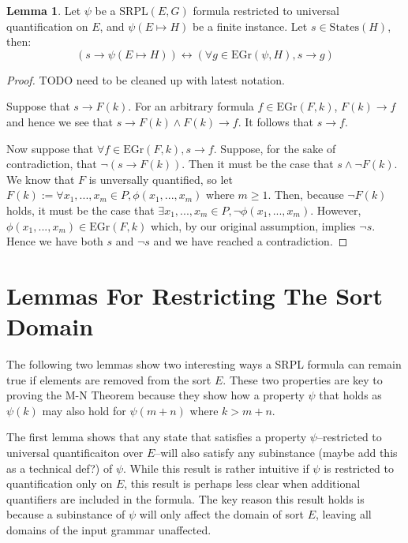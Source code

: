 \documentclass[12pt]{article}
\theoremstyle{definition}
\newtheorem{lemma}{Lemma}
\theoremstyle{remark}
\newcommand{\states}{\text{States}}
\newcommand{\gr}{\text{EGr}}
\newcommand{\SRPL}{\text{SRPL}}
\begin{document}
\begin{lemma}
  \label{lem:pnf-ground}
  Let $\psi$ be a $\SRPL(E,G)$ formula restricted to universal quantification on $E$, and $\psi(E \mapsto H)$ be a finite instance.  Let $s \in \states(H)$, then:
  $$(s \rightarrow \psi(E \mapsto H)) \leftrightarrow (\forall g \in \gr(\psi,H), s \rightarrow g)$$
\end{lemma}
\begin{proof}
  TODO need to be cleaned up with latest notation.

  Suppose that $s \rightarrow F(k)$.  For an arbitrary formula $f \in \gr(F,k)$, $F(k) \rightarrow f$ and hence we see that $s \rightarrow F(k) \land F(k) \rightarrow f$.  It follows that $s \rightarrow f$.

  Now suppose that $\forall f \in \gr(F,k), s \rightarrow f$.  Suppose, for the sake of contradiction, that $\neg(s \rightarrow F(k))$.  Then it must be the case that $s \land \neg F(k)$.  We know that $F$ is unversally quantified, so let $F(k) := \forall x_1,...,x_m \in P, \phi(x_1,...,x_m)$ where $m \geq 1$.  Then, because $\neg F(k)$ holds, it must be the case that $\exists x_1,...,x_m \in P, \neg \phi(x_1,...,x_m)$.  However, $\phi(x_1,...,x_m) \in \gr(F,k)$ which, by our original assumption, implies $\neg s$.  Hence we have both $s$ and $\neg s$ and we have reached a contradiction.
\end{proof}



\section{Lemmas For Restricting The Sort Domain}

The following two lemmas show two interesting ways a SRPL formula can remain true if elements are removed from the sort $E$.  These two properties are key to proving the M-N Theorem because they show how a property $\psi$ that holds as $\psi(k)$ may also hold for $\psi(m+n)$ where $k>m+n$.

The first lemma shows that any state that satisfies a property $\psi$--restricted to universal quantificaiton over $E$--will also satisfy any subinstance (maybe add this as a technical def?) of $\psi$.  While this result is rather intuitive if $\psi$ is restricted to quantification only on $E$, this result is perhaps less clear when additional quantifiers are included in the formula.  The key reason this result holds is because a subinstance of $\psi$ will only affect the domain of sort $E$, leaving all domains of the input grammar unaffected.
\end{document}
